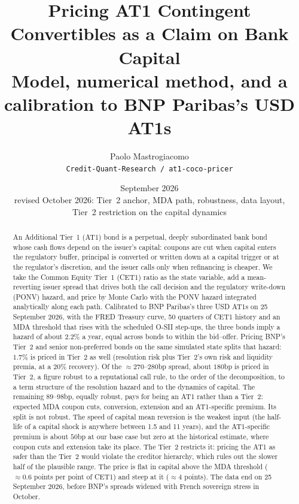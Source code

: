 \documentclass[11pt]{article}
\title{Pricing AT1 Contingent Convertibles as a Claim on Bank Capital\\[4pt]
\large Model, numerical method, and a calibration to BNP Paribas's USD AT1s}
\author{Paolo Mastrogiacomo \\ \texttt{Credit-Quant-Research / at1-coco-pricer}}
\date{September 2026 \\ \small revised October 2026: Tier~2 anchor, MDA path, robustness, data layout,\\ Tier~2 restriction on the capital dynamics}
\newcommand{\1}{\mathbf{1}}
\begin{document}
\maketitle

\begin{abstract}
An Additional Tier~1 (AT1) bond is a perpetual, deeply subordinated bank bond
whose cash flows depend on the issuer's capital: coupons are cut when capital
enters the regulatory buffer, principal is converted or written down at a
capital trigger or at the regulator's discretion, and the issuer calls only when
refinancing is cheaper. We take the Common Equity Tier~1 (CET1) ratio as the
state variable, add a mean-reverting issuer spread that drives both the call
decision and the regulatory write-down (PONV) hazard, and price by Monte Carlo
with the PONV hazard integrated analytically along each path. Calibrated to
BNP Paribas's three USD AT1s on 25 September 2026, with the FRED Treasury curve,
50 quarters of CET1 history and an MDA threshold that rises with the scheduled
O-SII step-ups, the three bonds imply a hazard of about $2.2\%$ a year, equal
across bonds to within the bid--offer. Pricing BNP's Tier~2 and senior
non-preferred bonds on the same simulated state splits that hazard: $1.7\%$ is
priced in Tier~2 as well (resolution risk plus Tier~2's own risk and liquidity
premia, at a $20\%$ recovery). Of the $\approx270$--$280$bp spread, about $180$bp
is priced in Tier~2, a figure robust to a reputational call rule, to the order of
the decomposition, to a term structure of the resolution hazard and to the
dynamics of capital. The remaining $89$--$98$bp, equally robust, pays for being an
AT1 rather than a Tier~2: expected MDA coupon cuts, conversion, extension and an
AT1-specific premium. Its split is not robust. The speed of capital mean reversion
is the weakest input (the half-life of a capital shock is anywhere between 1.5 and
11 years), and the AT1-specific premium is about $50$bp at our base case but zero at
the historical estimate, where coupon cuts and extension take its place. The Tier~2
restricts it: pricing the AT1 as safer than the Tier~2 would violate the creditor
hierarchy, which rules out the slower half of the plausible range. The price is
flat in capital above the MDA threshold ($\approx0.6$ points per point of CET1) and
steep at it ($\approx4$ points). The data end on 25 September 2026, before BNP's
spreads widened with French sovereign stress in October.
\end{abstract}

\tableofcontents
\end{document}
